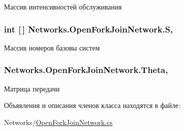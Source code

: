 Массив интенсивностей обслуживания 

\subsubsection[{\texorpdfstring{S}{S}}]{\setlength{\rightskip}{0pt plus 5cm}int \mbox{[}$\,$\mbox{]} Networks.\+Open\+Fork\+Join\+Network.\+S\hspace{0.3cm}{\ttfamily [get]}, {\ttfamily [set]}}\hypertarget{class_networks_1_1_open_fork_join_network_a3081d74c0bb207dc059d4e7819c0791e}{}\label{class_networks_1_1_open_fork_join_network_a3081d74c0bb207dc059d4e7819c0791e}


Массив номеров базовы систем 

\subsubsection[{\texorpdfstring{Theta}{Theta}}]{ Networks.\+Open\+Fork\+Join\+Network.\+Theta\hspace{0.3cm}{\ttfamily [get]}, {\ttfamily [set]}}\hypertarget{class_networks_1_1_open_fork_join_network_a3cc59e2da1ed4cd8efc9c799664d6590}{}\label{class_networks_1_1_open_fork_join_network_a3cc59e2da1ed4cd8efc9c799664d6590}


Матрица передачи 



Объявления и описания членов класса находятся в файле\+:\begin{DoxyCompactItemize}
\item 
Networks/\hyperlink{_open_fork_join_network_8cs}{Open\+Fork\+Join\+Network.\+cs}\end{DoxyCompactItemize}

